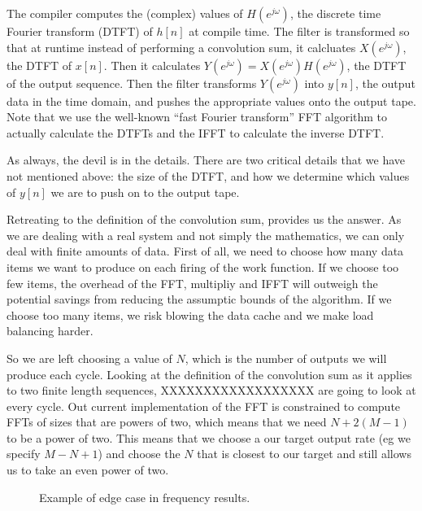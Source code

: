 The compiler computes the (complex) values of $H(e^{j\omega})$, the discrete time 
Fourier transform (DTFT) of $h[n]$ at compile time. The filter is transformed 
so that at runtime instead of performing a convolution sum, it calcluates  
$X(e^{j\omega})$, the DTFT of $x[n]$. Then it calculates 
$Y(e^{j\omega})=X(e^{j\omega})H(e^{j\omega})$, the DTFT of the output sequence.
Then the filter transforms $Y(e^{j\omega})$ into $y[n]$, the output data in the
time domain, and pushes the appropriate values onto the output tape. Note that we
use the well-known ``fast Fourier transform'' FFT algorithm to actually calculate
the DTFTs and the IFFT to calculate the inverse DTFT.

As always, the devil is in the details. There are two critical details that 
we have not mentioned above: the size of the DTFT, and how we determine which
values of $y[n]$ we are to push on to the output tape. 

Retreating to the definition of the convolution sum, provides us the answer.
As we are dealing with a real system and not simply the mathematics, we can only 
deal with finite amounts of data. First of all, we need to choose how many data items
we want to produce on each firing of the work function. If we choose too few items,
the overhead of the FFT, multipliy and IFFT will outweigh the potential savings
from reducing the assumptic bounds of the algorithm. If we choose too many items, we
risk blowing the data cache and we make load balancing harder. 

So we are left choosing a value of $N$, which is the number of outputs we will produce
each cycle. Looking at the definition of the convolution sum as it applies to 
two finite length sequences, XXXXXXXXXXXXXXXXXX
are going to look at every cycle. Out current implementation of the FFT is constrained
to compute FFTs of sizes that are powers of two, which means that we need $N+2(M-1)$ 
to be a power of two. This means that we choose a our target output rate 
(eg we specify $M-N+1$) and choose the $N$ that is closest to our target and still
allows us to take an even power of two.


\begin{figure}
\center
\epsfxsize=3.0in
\caption{Example of edge case in frequency results.}
\label{fig:frequency-example}
\end{figure}
